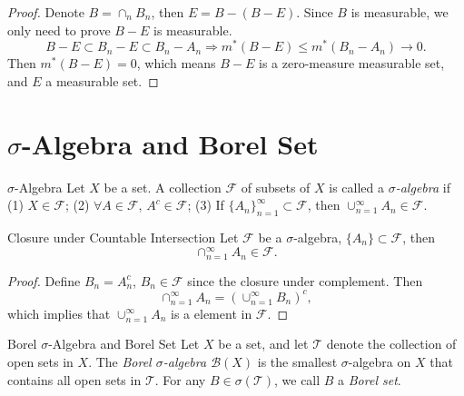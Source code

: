 \begin{proof}
  Denote $B = \cap _n B_n$, then $E = B - (B - E)$.
  Since $B$ is measurable, we only need to prove $B - E$ is measurable.
  \begin{equation}
    B - E \subset B_n - E \subset B_n - A_n \Rightarrow m^{\ast}(B - E) \leq m^{\ast}(B_n - A_n) \rightarrow 0.
  \end{equation}
  Then $m^{\ast}(B - E) = 0$, which means $B - E$ is a zero-measure measurable set,
  and $E$ a measurable set.
\end{proof}

\section{$\sigma$-Algebra and Borel Set}

\begin{definition}{$\sigma$-Algebra}{}
  Let $X$ be a set. A collection $\mathcal{F}$ of subsets of $X$ is called a
  \emph{$\sigma$-algebra} if
  (1) $X \in \mathcal{F}$;
  (2) $\forall A \in \mathcal{F}$, $A^c \in \mathcal{F}$;
  (3) If $\{A_n\}_{n=1}^{\infty} \subset \mathcal{F}$, then $\cup _{n = 1}^{\infty} A_n \in \mathcal{F}$.
\end{definition}

\begin{proposition}{Closure under Countable Intersection}{}
  Let $\mathcal{F}$ be a $\sigma$-algebra, $\{A_n\} \subset \mathcal{F}$,
  then 
  \begin{equation}
    \cap _{n = 1}^{\infty} A_n \in \mathcal{F}.
  \end{equation}
\end{proposition}

\begin{proof}
  Define $B_n = A_n^c$, $B_n \in \mathcal{F}$ since the closure under complement.
  Then
  \begin{equation}
    \cap_{n=1}^{\infty} A_n = (\cup_{n=1}^{\infty}B_n)^c,
  \end{equation}
  which implies that $\cup_{n=1}^{\infty}A_n$ is a element in $\mathcal{F}$.
\end{proof}

\begin{definition}{Borel $\sigma$-Algebra and Borel Set}{}
  Let $X$ be a set,
  and let $\mathcal{T}$ denote the collection of open sets in $X$.
  The \emph{Borel $\sigma$-algebra $\mathcal{B}(X)$} is the smallest $\sigma$-algebra
  on $X$ that contains all open sets in $\mathcal{T}$.
  For any $B \in \sigma(\mathcal{T})$,
  we call $B$ a \emph{Borel set}.
\end{definition}




